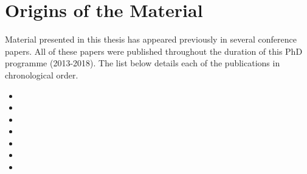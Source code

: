 \section{Origins of the Material}
Material presented in this thesis has appeared previously in several conference papers. All of these papers were published throughout the duration of this PhD programme (2013-2018). The list below details each of the publications in chronological order.

\begin{itemize}
    \item{}
    \item{}
    \item{}
    \item{}
    \item{}
    \item{}
    \item{}
\end{itemize}

